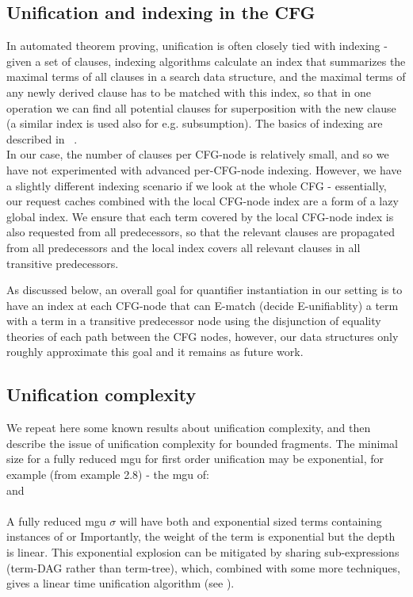 \subsection*{Unification and indexing in the CFG}
In automated theorem proving, unification is often closely tied with indexing - given a set of clauses, indexing algorithms calculate an index that summarizes the maximal terms of all clauses in a search data structure, and the maximal terms of any newly derived clause has to be matched with this index, so that in one operation we can find all potential clauses for superposition with the new clause (a similar index is used also for e.g. subsumption). 
The basics of indexing are described in ~\cite{Sekar20011853}.\\
In our case, the number of clauses per CFG-node is relatively small, and so we have not experimented with advanced per-CFG-node indexing. 
However, we have a slightly different indexing scenario if we look at the whole CFG - essentially, 
our request caches combined with the local CFG-node index are a form of a lazy global index. 
We ensure that each term covered by the local CFG-node index is also requested from all predecessors, so that the relevant clauses are propagated from all predecessors and the local index covers all relevant clauses in all transitive predecessors.

As discussed below, an overall goal for quantifier instantiation in our setting is to have an index at each CFG-node that can E-match (decide E-unifiablity) a term with a term in a transitive predecessor node using the disjunction of equality theories of each path between the CFG nodes, however, our data structures only roughly approximate this goal and it remains as future work.

\subsection*{Unification complexity}
We repeat here some known results about unification complexity, and then describe the issue of unification complexity for bounded fragments.
The minimal size for a fully reduced mgu for first order unification may be exponential, for example (from \cite{Baader2001445} example 2.8) - the mgu of:\\
 and \\
\\
A fully reduced mgu $\sigma$ will have both  and  exponential sized terms containing  instances of  or  Importantly, the weight of the term is exponential but the depth is linear.
This exponential explosion can be mitigated by sharing sub-expressions (term-DAG rather than term-tree), which, combined with some more techniques, gives a linear time unification algorithm (see \cite{Paterson1978158}).

